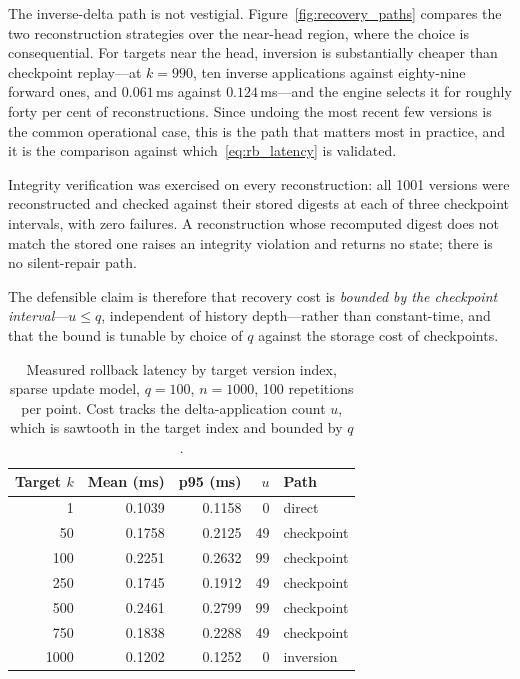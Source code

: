 \documentclass[final,5p,times,twocolumn]{elsarticle}
\begin{document}
The inverse-delta path is not vestigial. Figure~\ref{fig:recovery_paths}
compares the two reconstruction strategies over the near-head region,
where the choice is consequential. For targets near the head,
inversion is substantially cheaper than checkpoint
replay---at $k = 990$, ten inverse applications against eighty-nine
forward ones, and $0.061$\,ms against $0.124$\,ms---and the engine
selects it for roughly forty per cent of reconstructions. Since
undoing the most recent few versions is the common operational case,
this is the path that matters most in practice, and it is the
comparison against which~\eqref{eq:rb_latency} is validated.


Integrity verification was exercised on every reconstruction: all 1001 versions
were reconstructed and checked against their stored digests at each of three
checkpoint intervals, with zero failures. A reconstruction whose recomputed
digest does not match the stored one raises an integrity violation and returns
no state; there is no silent-repair path.

The defensible claim is therefore that recovery cost is \emph{bounded by the
checkpoint interval}---$u \leq q$, independent of history depth---rather than
constant-time, and that the bound is tunable by choice of $q$ against the
storage cost of checkpoints.

\begin{table}[htbp]\centering
\caption{Measured rollback latency by target version index, sparse update model,
$q=100$, $n=1000$, 100 repetitions per point. Cost tracks the delta-application
count $u$, which is sawtooth in the target index and bounded by $q$.}
\label{tab:c3_lifecycle}
\begin{tabular}{rrrrl}\toprule
Target $k$ & Mean (ms) & p95 (ms) & $u$ & Path \\\midrule
1    & 0.1039 & 0.1158 &  0 & direct \\
50   & 0.1758 & 0.2125 & 49 & checkpoint \\
100  & 0.2251 & 0.2632 & 99 & checkpoint \\
250  & 0.1745 & 0.1912 & 49 & checkpoint \\
500  & 0.2461 & 0.2799 & 99 & checkpoint \\
750  & 0.1838 & 0.2288 & 49 & checkpoint \\
1000 & 0.1202 & 0.1252 &  0 & inversion \\
\bottomrule\end{tabular}
\end{table}
\end{document}
